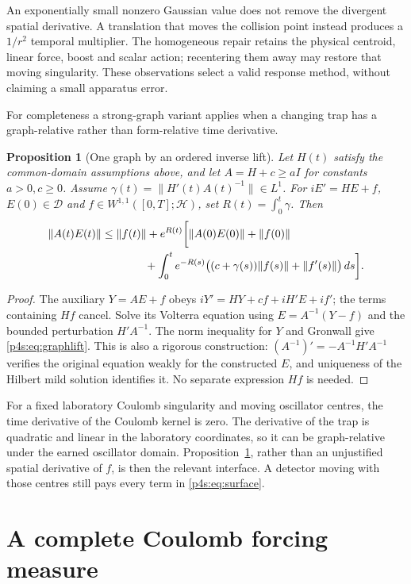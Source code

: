 \documentclass[11pt]{article}
\numberwithin{equation}{section}
\newtheorem{proposition}[theorem]{Proposition}
\theoremstyle{definition}
\theoremstyle{remark}
\begin{document}
An exponentially small nonzero Gaussian value does not remove the
divergent spatial derivative. A translation that moves the collision
point instead produces a $1/r^2$ temporal multiplier. The homogeneous
repair retains the physical centroid, linear force, boost and scalar
action; recentering them away may restore that moving singularity.
These observations select a valid response method, without claiming a
small apparatus error.

For completeness a strong-graph variant applies when a changing trap
has a graph-relative rather than form-relative time derivative.
\begin{proposition}[One graph by an ordered inverse lift]
\label{p4s:prop:graph}
Let $H(t)$ satisfy the common-domain assumptions above, and let
$A=H+c\geq aI$ for constants $a>0,c\geq0$.
Assume $\gamma(t)=\|H'(t)A(t)^{-1}\|\in L^1$.
For $iE'=HE+f$, $E(0)\in\mathcal D$ and
$f\in W^{1,1}([0,T];\mathcal H)$, set $R(t)=\int_0^t\gamma$.
Then
\begin{align}
 \|A(t)E(t)\|\leq{}&\|f(t)\|+
 e^{R(t)}\biggl[\|A(0)E(0)\|+\|f(0)\|\nonumber\\
 &\hspace{9mm}+\int_0^t e^{-R(s)}
       \bigl((c+\gamma(s))\|f(s)\|+\|f'(s)\|\bigr)\,ds\biggr].
       \label{p4s:eq:graphlift}
\end{align}
\end{proposition}
\begin{proof}
The auxiliary $Y=AE+f$ obeys
$iY'=HY+cf+iH'E+if'$; the terms containing $Hf$ cancel.
Solve its Volterra equation using
$E=A^{-1}(Y-f)$ and the bounded perturbation $H'A^{-1}$.
The norm inequality for $Y$ and Gronwall give
\eqref{p4s:eq:graphlift}. This is also a rigorous construction:
$(A^{-1})'=-A^{-1}H'A^{-1}$ verifies the original equation weakly
for the constructed $E$, and uniqueness of the Hilbert mild solution
identifies it. No separate expression $Hf$ is needed.
\end{proof}

For a fixed laboratory Coulomb singularity and moving oscillator
centres, the time derivative of the Coulomb kernel is zero. The
derivative of the trap is quadratic and linear in the laboratory
coordinates, so it can be graph-relative under the earned oscillator
domain. Proposition~\ref{p4s:prop:graph}, rather than an unjustified
spatial derivative of $f$, is then the relevant interface. A detector
moving with those centres still pays every term in
\eqref{p4s:eq:surface}.

\section{A complete Coulomb forcing measure}
\label{p4h:sec:spectral}
\end{document}
